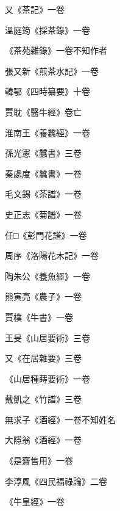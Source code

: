 \begin{pinyinscope}
 又《茶記》一卷



 溫庭筠《採茶錄》一卷



 《茶苑雜錄》一卷不知作者



 張又新《煎茶水記》一卷



 韓鄂《四時纂要》十卷



 賈耽《醫牛經》卷亡



 淮南王《養蠶經》一卷



 孫光憲《蠶書》三卷



 秦處度《蠶書》一卷



 毛文錫《茶譜》一卷



 史正志《菊譜》一卷



 任□《彭門花譜》一卷



 周序《洛陽花木記》一卷



 陶朱公《養魚經》一卷



 熊寅亮《農子》一卷



 賈樸《牛書》一卷



 王旻《山居要術》三卷



 又《在居雜要》三卷



 《山居種蒔要術》一卷



 戴凱之《竹譜》三卷



 無求子《酒經》一卷不知姓名



 大隱翁《酒經》一卷



 《是齋售用》一卷



 李淳風《四民福祿論》二卷



 《牛皇經》一卷




\end{pinyinscope}
